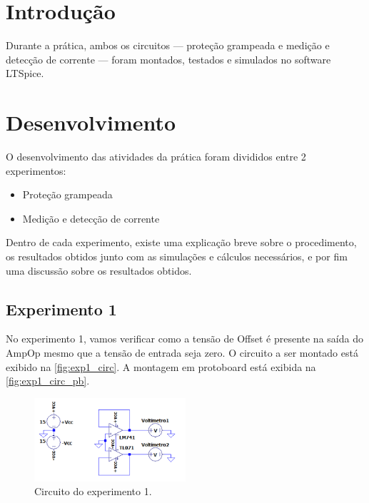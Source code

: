 \documentclass[
	12pt,				%
	oneside,			%
	a4paper,			%
	chapter=TITLE,
	sumario=tradicional,
	english,			%
	brazil				%
]{abntex2}
\begin{document}
\chapter{Introdução}\label{cap:introdução} 




Durante a prática, ambos os circuitos — proteção grampeada e medição e detecção de corrente — foram montados, testados e simulados no software LTSpice.

\chapter{Desenvolvimento}

O desenvolvimento das atividades da prática foram divididos entre 2 experimentos:
\begin{itemize}
    \item Proteção grampeada
    \item Medição e detecção de corrente

\end{itemize}
Dentro de cada experimento, existe uma explicação breve sobre o procedimento, os resultados obtidos junto com as simulações e cálculos necessários, e por fim uma discussão sobre os resultados obtidos.

\section{Experimento 1}

No experimento 1, vamos verificar como a tensão de Offset é presente na saída do AmpOp mesmo que a tensão de entrada seja zero. O circuito a ser montado 
está exibido na \autoref{fig:exp1_circ}. A montagem em protoboard está exibida na \autoref{fig:exp1_circ_pb}.

\begin{figure}[h!]
	\caption{\label{fig:exp1_circ} Circuito do experimento 1.}
	\begin{center}
    \includegraphics[width=0.5\textwidth,trim=1 1 1 1,clip]{images/Pratica4/exp1_circ.png}
	\end{center}
\end{figure}
\end{document}
